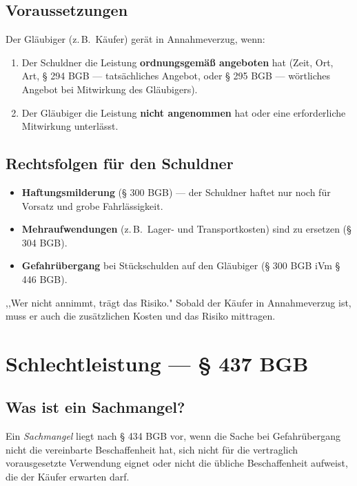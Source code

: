 \documentclass[11pt, a4paper]{article}
\begin{document}
\subsection{Voraussetzungen}

Der Gläubiger (z.\,B.\ Käufer) gerät in Annahmeverzug, wenn:

\begin{enumerate}[itemsep=2pt]
  \item Der Schuldner die Leistung \textbf{ordnungsgemäß angeboten} hat (Zeit, Ort, Art, § 294 BGB --- tatsächliches Angebot, oder § 295 BGB --- wörtliches Angebot bei Mitwirkung des Gläubigers).
  \item Der Gläubiger die Leistung \textbf{nicht angenommen} hat oder eine erforderliche Mitwirkung unterlässt.
\end{enumerate}

\subsection{Rechtsfolgen für den Schuldner}

\begin{itemize}[itemsep=2pt]
  \item \textbf{Haftungsmilderung} (§ 300 BGB) --- der Schuldner haftet nur noch für Vorsatz und grobe Fahrlässigkeit.
  \item \textbf{Mehraufwendungen} (z.\,B.\ Lager- und Transportkosten) sind zu ersetzen (§ 304 BGB).
  \item \textbf{Gefahrübergang} bei Stückschulden auf den Gläubiger (§ 300 BGB iVm § 446 BGB).
\end{itemize}

\begin{eselsbruecke}
,,Wer nicht annimmt, trägt das Risiko." Sobald der Käufer in Annahmeverzug ist,
muss er auch die zusätzlichen Kosten und das Risiko mittragen.
\end{eselsbruecke}

\section{Schlechtleistung --- § 437 BGB}

\subsection{Was ist ein Sachmangel?}

Ein \emph{Sachmangel} liegt nach § 434 BGB vor, wenn die Sache bei Gefahrübergang
nicht die vereinbarte Beschaffenheit hat, sich nicht für die vertraglich vorausgesetzte
Verwendung eignet oder nicht die übliche Beschaffenheit aufweist, die der Käufer
erwarten darf.
\end{document}
